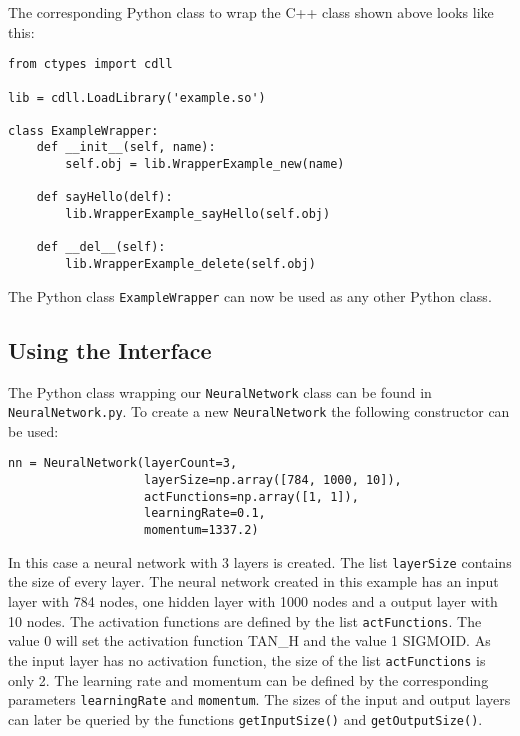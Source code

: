 \documentclass{acm_proc_article-sp}
\begin{document}
The corresponding Python class to wrap the C++ class shown above looks like this:

\lstset{language=Python}
\begin{lstlisting}[caption=Python class wrapping the C++ class shown above (Example.py)]
from ctypes import cdll

lib = cdll.LoadLibrary('example.so')

class ExampleWrapper:
    def __init__(self, name):
        self.obj = lib.WrapperExample_new(name)

    def sayHello(delf):
        lib.WrapperExample_sayHello(self.obj)

    def __del__(self):
        lib.WrapperExample_delete(self.obj)
\end{lstlisting}

The Python class \texttt{ExampleWrapper} can now be used as any other Python class.

\subsection{Using the Interface}
The Python class wrapping our \texttt{NeuralNetwork} class can be found in \texttt{NeuralNetwork.py}. To create a new \texttt{NeuralNetwork} the following constructor can be used:

\lstset{language=Python}
\begin{lstlisting}[caption=Constructor to create a neural network]
nn = NeuralNetwork(layerCount=3,
                   layerSize=np.array([784, 1000, 10]),
                   actFunctions=np.array([1, 1]),
                   learningRate=0.1,
                   momentum=1337.2)
\end{lstlisting}

In this case a neural network with 3 layers is created. The list \texttt{layerSize} contains the size of every layer. The neural network created in this example has an input layer with 784 nodes, one hidden layer with 1000 nodes and a output layer with 10 nodes. The activation functions are defined by the list \texttt{actFunctions}. The value 0 will set the activation function TAN\_H and the value 1 SIGMOID. As the input layer has no activation function, the size of the list \texttt{actFunctions} is only 2. The learning rate and momentum can be defined by the corresponding parameters \texttt{learningRate} and \texttt{momentum}. The sizes of the input and output layers can later be queried by the functions \texttt{getInputSize()} and \texttt{getOutputSize()}.
\end{document}
